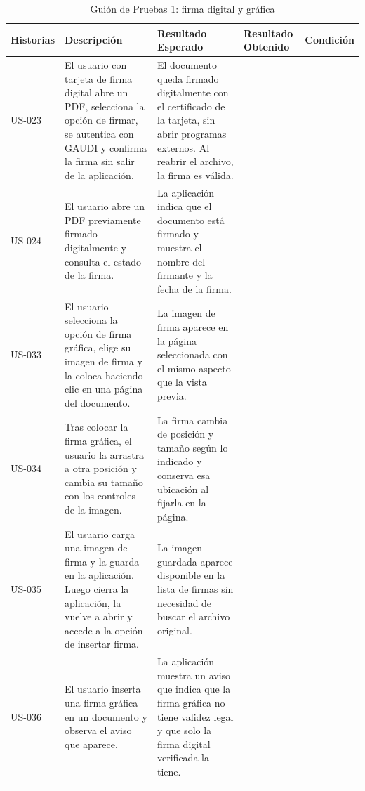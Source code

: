 \begin{longtable}{ | p{2cm} | p{3cm} | p{4cm} | p{4cm} | c |}
      \hline
      \textbf{Historias} & \textbf{Descripción} & \textbf{Resultado Esperado} & \textbf{Resultado Obtenido} & \textbf{Condición}\\
      \hline
      US-023 &
      El usuario con tarjeta de firma digital abre un PDF, selecciona la opción de firmar, se autentica con GAUDI y confirma la firma sin salir de la aplicación. &
      El documento queda firmado digitalmente con el certificado de la tarjeta, sin abrir programas externos. Al reabrir el archivo, la firma es válida. &
       &
      \\
      \hline
      US-024 &
      El usuario abre un PDF previamente firmado digitalmente y consulta el estado de la firma. &
      La aplicación indica que el documento está firmado y muestra el nombre del firmante y la fecha de la firma. &
       &
      \\
      \hline
      US-033 &
      El usuario selecciona la opción de firma gráfica, elige su imagen de firma y la coloca haciendo clic en una página del documento. &
      La imagen de firma aparece en la página seleccionada con el mismo aspecto que la vista previa. &
       &
      \\
      \hline
      US-034 &
      Tras colocar la firma gráfica, el usuario la arrastra a otra posición y cambia su tamaño con los controles de la imagen. &
      La firma cambia de posición y tamaño según lo indicado y conserva esa ubicación al fijarla en la página. &
       &
      \\
      \hline
      US-035 &
      El usuario carga una imagen de firma y la guarda en la aplicación. Luego cierra la aplicación, la vuelve a abrir y accede a la opción de insertar firma. &
      La imagen guardada aparece disponible en la lista de firmas sin necesidad de buscar el archivo original. &
       &
      \\
      \hline
      US-036 &
      El usuario inserta una firma gráfica en un documento y observa el aviso que aparece. &
      La aplicación muestra un aviso que indica que la firma gráfica no tiene validez legal y que solo la firma digital verificada la tiene. &
       &
      \\
      \hline
 
      \caption{Guión de Pruebas 1: firma digital y gráfica}
      \label{TestScript1}
\end{longtable}
 
